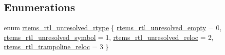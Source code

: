 \subsection*{Enumerations}
\begin{DoxyCompactItemize}
\item 
enum \mbox{\hyperlink{rtl-unresolved_8h_a4c5be38f1158006e6bc839d4f060ecb6}{rtems\+\_\+rtl\+\_\+unresolved\+\_\+rtype}} \{ \mbox{\hyperlink{rtl-unresolved_8h_a4c5be38f1158006e6bc839d4f060ecb6a9af477d1ef0e0b8be43370bb52e7420e}{rtems\+\_\+rtl\+\_\+unresolved\+\_\+empty}} = 0, 
\mbox{\hyperlink{rtl-unresolved_8h_a4c5be38f1158006e6bc839d4f060ecb6a5905d0ac5f9a65c71669a4de813dd185}{rtems\+\_\+rtl\+\_\+unresolved\+\_\+symbol}} = 1, 
\mbox{\hyperlink{rtl-unresolved_8h_a4c5be38f1158006e6bc839d4f060ecb6a4ff5fbb56fb173f39d3139ddbe8c0a44}{rtems\+\_\+rtl\+\_\+unresolved\+\_\+reloc}} = 2, 
\mbox{\hyperlink{rtl-unresolved_8h_a4c5be38f1158006e6bc839d4f060ecb6afffec0f7b1db813d8bbdf281637a1cc6}{rtems\+\_\+rtl\+\_\+trampoline\+\_\+reloc}} = 3
 \}
\end{DoxyCompactItemize}
